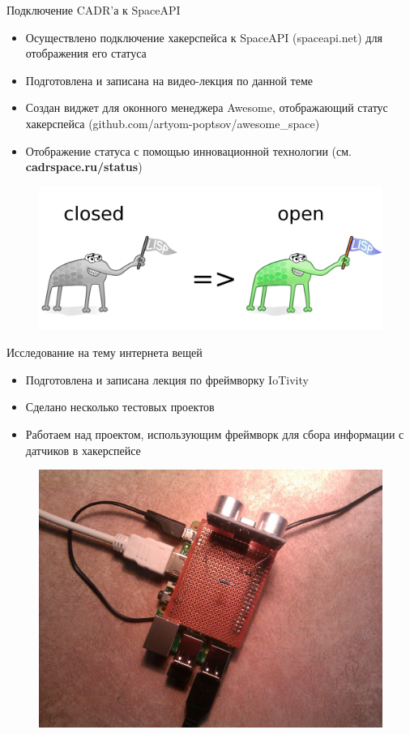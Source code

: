 \documentclass[presentation]{beamer}
\begin{document}
\begin{frame}[label=sec-2-2-2]{Подключение CADR'а к SpaceAPI}
  \begin{itemize}
  \item Осуществлено подключение хакерспейса к SpaceAPI (spaceapi.net)
    для отображения его статуса
  \item Подготовлена и записана на видео-лекция по данной теме
  \item Создан виджет для оконного менеджера Awesome, отображающий
    статус хакерспейса (github.com/artyom-poptsov/awesome\_space)
  \item Отображение статуса с помощью инновационной технологии
    (см. \textbf{cadrspace.ru/status})
  \end{itemize}
  \begin{figure}[htb]
    \centering
    \includegraphics[width=.9\linewidth]{cadr-status}
  \end{figure}
\end{frame}

\begin{frame}[label=sec-2-2-3]{Исследование на тему интернета вещей}
  \begin{itemize}
    \item Подготовлена и записана лекция по фреймворку IoTivity
    \item Сделано несколько тестовых проектов
    \item Работаем над проектом, использующим фреймворк для сбора
      информации с датчиков в хакерспейсе
  \end{itemize}
  \begin{figure}[htb]
    \centering
    \includegraphics[width=.7\linewidth]{./graphics/raspberry-pi.jpg}
  \end{figure}
\end{frame}
\end{document}
